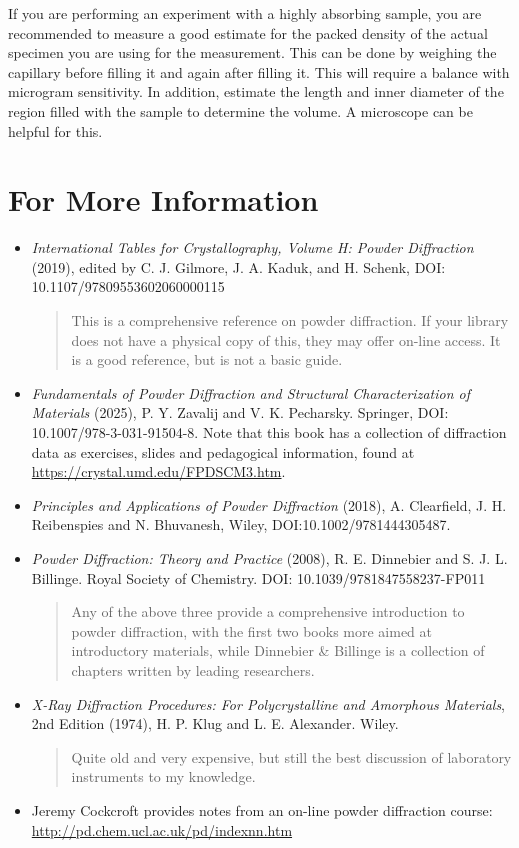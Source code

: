 If you are performing an experiment with a highly absorbing sample, you are recommended to measure a good estimate for the packed density of the actual specimen you are using for the measurement. This can be done by weighing the capillary before filling it and again after filling it. This will require a balance with microgram sensitivity. In addition, estimate the length and inner diameter of the region filled with the sample to determine the volume. A microscope can be helpful for this. 

\section{For More Information}

\begin{itemize}
\item 
  \textit{International Tables for Crystallography, Volume H: Powder Diffraction} (2019), edited by C. J. Gilmore, J. A. Kaduk, and H. Schenk, DOI: 10.1107/97809553602060000115
  \begin{quote}
This is a comprehensive reference on powder diffraction. If your library does not have a physical copy of this, they may offer on-line access. It is a good reference, but is not a basic guide. 
  \end{quote}

\item\textit{Fundamentals of Powder Diffraction and Structural Characterization of Materials} (2025), P. Y. Zavalij and V. K. Pecharsky. Springer, DOI: 10.1007/978-3-031-91504-8. Note that this book has a collection of diffraction data as exercises, slides and pedagogical information, found at \url{https://crystal.umd.edu/FPDSCM3.htm}.

\item\textit{Principles and Applications of Powder Diffraction} (2018), A. Clearfield, J. H. Reibenspies and N. Bhuvanesh, Wiley, DOI:10.1002/9781444305487.  

\item\textit{Powder Diffraction: Theory and Practice} (2008), R. E. Dinnebier and S. J. L. Billinge. Royal Society of Chemistry.
DOI: 10.1039/9781847558237-FP011
\begin{quote}
Any of the above three provide a comprehensive introduction to powder diffraction, with the first two books more aimed at introductory materials, while Dinnebier \& Billinge is a collection of chapters written by leading researchers.
\end{quote}

\item\textit{X-Ray Diffraction Procedures: For Polycrystalline and Amorphous Materials}, 2nd Edition (1974), H. P. Klug and L. E. Alexander. Wiley. 
\begin{quote}
Quite old and very expensive, but still the best discussion of laboratory instruments to my knowledge. 
\end{quote}

\item
Jeremy Cockcroft provides notes from an on-line powder diffraction course:
\url{http://pd.chem.ucl.ac.uk/pd/indexnn.htm}

\end{itemize}
